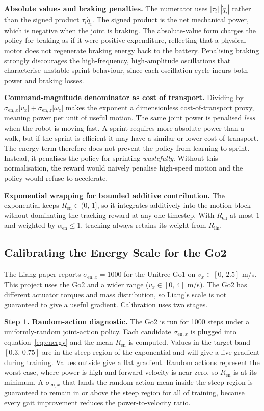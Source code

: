 \documentclass[a4paper,11pt]{article}
\begin{document}
    \textbf{Absolute values and braking penalties.} The numerator uses $|\tau_i|\,|\dot q_i|$ rather than the signed product $\tau_i\dot q_i$. The signed product is the net mechanical power, which is negative when the joint is braking. The absolute-value form charges the policy for braking as if it were positive expenditure, reflecting that a physical motor does not regenerate braking energy back to the battery. Penalising braking strongly discourages the high-frequency, high-amplitude oscillations that characterise unstable sprint behaviour, since each oscillation cycle incurs both power and braking losses.

    \textbf{Command-magnitude denominator as cost of transport.} Dividing by $\sigma_{\mathrm{en},x}|v_x| + \sigma_{\mathrm{en},z}|\omega_z|$ makes the exponent a dimensionless cost-of-transport proxy, meaning power per unit of useful motion. The same joint power is penalised \textit{less} when the robot is moving fast. A sprint requires more absolute power than a walk, but if the sprint is efficient it may have a similar or lower cost of transport. The energy term therefore does not prevent the policy from learning to sprint. Instead, it penalises the policy for sprinting \textit{wastefully}. Without this normalisation, the reward would naively penalise high-speed motion and the policy would refuse to accelerate.

    \textbf{Exponential wrapping for bounded additive contribution.} The exponential keeps $R_{\mathrm{en}} \in (0,\,1]$, so it integrates additively into the motion block without dominating the tracking reward at any one timestep. With $R_{\mathrm{en}}$ at most $1$ and weighted by $\alpha_{\mathrm{en}} \le 1$, tracking always retains its weight from $R_{\mathrm{lin}}$.

    \subsection{Calibrating the Energy Scale for the Go2}

    The Liang paper reports $\sigma_{\mathrm{en},x}=1000$ for the Unitree Go1 on $v_x \in [0,\,2.5]$ m/s. This project uses the Go2 and a wider range ($v_x \in [0,\,4]$ m/s). The Go2 has different actuator torques and mass distribution, so Liang's scale is not guaranteed to give a useful gradient. Calibration uses two stages.

    \textbf{Step 1. Random-action diagnostic.} The Go2 is run for 1000 steps under a uniformly-random joint-action policy. Each candidate $\sigma_{\mathrm{en},x}$ is plugged into equation~\eqref{eq:energy} and the mean $R_{\mathrm{en}}$ is computed. Values in the target band $[0.3,\,0.75]$ are in the steep region of the exponential and will give a live gradient during training. Values outside give a flat gradient. Random actions represent the worst case, where power is high and forward velocity is near zero, so $R_{\mathrm{en}}$ is at its minimum. A $\sigma_{\mathrm{en},x}$ that lands the random-action mean inside the steep region is guaranteed to remain in or above the steep region for all of training, because every gait improvement reduces the power-to-velocity ratio.
\end{document}
